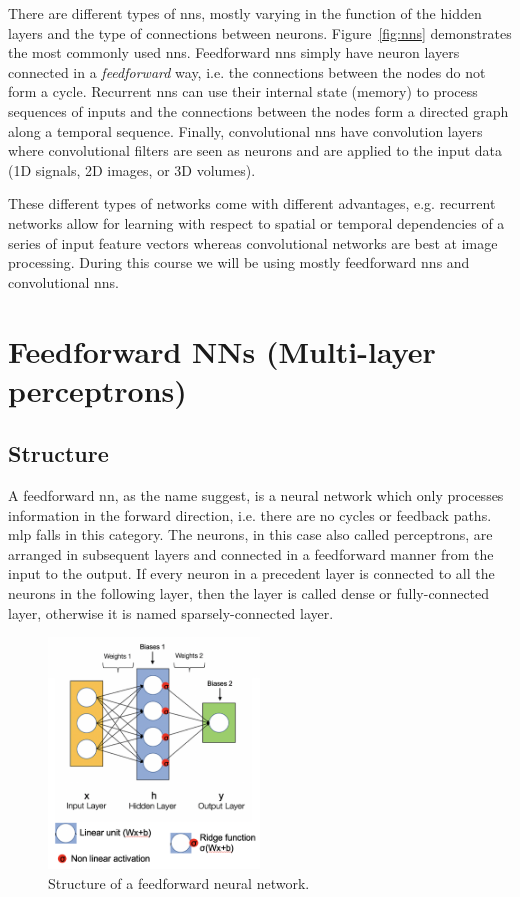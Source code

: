 \documentclass[parskip=half,notes,cadrem,toolver]{iisvlsi}
\begin{document}
There are different types of \glspl{nn}, mostly varying in the function of the hidden layers and the type of connections between neurons. Figure~\ref{fig:nns} demonstrates the most commonly used \glspl{nn}. Feedforward \glspl{nn} simply have neuron layers connected in a \emph{feedforward} way, i.e. the connections between the nodes do not form a cycle. Recurrent \glspl{nn} can use their internal state (memory) to process sequences of inputs and the connections between the nodes form a directed graph along a temporal sequence. Finally, convolutional \glspl{nn} have convolution layers where convolutional filters are seen as neurons and are applied to the input data (1D signals, 2D images, or 3D volumes). 

These different types of networks come with different advantages, e.g. recurrent networks allow for learning with respect to spatial or temporal dependencies of a series of input feature vectors whereas convolutional networks are best at image processing. During this course we will be using mostly feedforward \glspl{nn} and convolutional \glspl{nn}.


\section{Feedforward NNs (Multi-layer perceptrons)}

\subsection{Structure}

A feedforward \gls{nn}, as the name suggest, is a neural network which only processes information in the forward direction, i.e. there are no cycles or feedback paths. \gls{mlp} falls in this category. The neurons, in this case also called perceptrons, are arranged in subsequent layers and connected in a feedforward manner from the input to the output. If every neuron in a precedent layer is connected to all the neurons in the following layer, then the layer is called dense or fully-connected layer, otherwise it is named sparsely-connected layer. 

\begin{figure}[t]
    \centering
    \includegraphics[width=0.5\textwidth]{figures/ANN_2.png}
    \caption{Structure of a feedforward neural network.}
    \label{fig:ann_2}
\end{figure}
\end{document}
